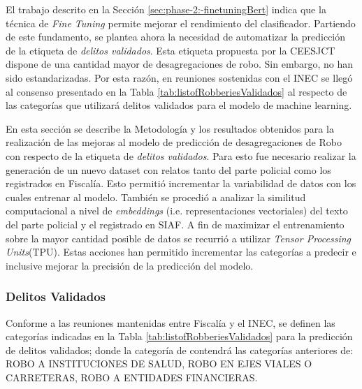 \documentclass[onecolumn, journal, english, 12pt, a4paper]{IEEEtran} %
\newcommand{\printInicialesComision}{CEESJCT}
\theoremstyle{definition}
\begin{document}
El trabajo descrito en la Sección \ref{sec:phase-2:-finetuningBert}
indica que la técnica de \emph{Fine Tuning} permite mejorar el
rendimiento del clasificador. Partiendo de este fundamento, se plantea
ahora la necesidad de automatizar la predicción de la etiqueta de
\emph{delitos validados}. Esta etiqueta propuesta por la
\printInicialesComision\, dispone de una cantidad mayor de
desagregaciones de robo. Sin embargo, no han sido estandarizadas. Por
esta razón, en reuniones sostenidas con el INEC se llegó al consenso
presentado en la Tabla \ref{tab:listofRobberiesValidados} al respecto
de las categorías que utilizará delitos validados para el modelo de
machine learning.

En esta sección se describe la Metodología y los resultados obtenidos
para la realización de las mejoras al modelo de predicción de
desagregaciones de Robo con respecto de la etiqueta de \emph{delitos
  validados}. Para esto fue necesario realizar la generación de un
nuevo dataset con relatos tanto del parte policial como los
registrados en Fiscalía. Esto permitió incrementar la variabilidad de
datos con los cuales entrenar al modelo. También se procedió a
analizar la similitud computacional a nivel de \emph{embeddings}
(i.e. representaciones vectoriales) del texto del parte policial y el
registrado en SIAF. A fin de maximizar el entrenamiento sobre la mayor
cantidad posible de datos se recurrió a utilizar \emph{Tensor
  Processing Units}(TPU). Estas acciones han permitido incrementar las
categorías a predecir e inclusive mejorar la precisión de la
predicción del modelo.

\subsubsection{Delitos Validados}
Conforme a las reuniones mantenidas entre Fiscalía y el INEC, se
definen las categorías indicadas en la Tabla
\ref{tab:listofRobberiesValidados} para la predicción de delitos
validados; donde la categoría de  contendrá las
categorías anteriores de: ROBO A INSTITUCIONES DE SALUD, ROBO EN EJES
VIALES O CARRETERAS, ROBO A ENTIDADES FINANCIERAS.
\end{document}
